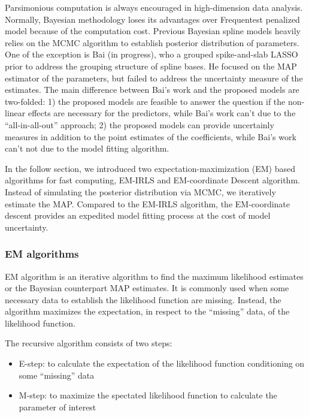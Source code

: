 \documentclass[AMA,STIX1COL,]{WileyNJD-v2}
\providecommand{\tightlist}{%
  \setlength{\itemsep}{0pt}\setlength{\parskip}{0pt}}
\begin{document}
Parsimonious computation is always encouraged in high-dimension data
analysis. Normally, Bayesian methodology loses its advantages over
Frequentest penalized model because of the computation cost. Previous
Bayesian spline models heavily relies on the MCMC algorithm to establish
posterior distribution of parameters. One of the exception is Bai (in
progress), who a grouped spike-and-slab LASSO prior \citep{Rockova2018}
to address the grouping structure of spline bases. He focused on the MAP
estimator of the parameters, but failed to address the uncertainty
measure of the estimates. The main difference between Bai's work and the
proposed models are two-folded: 1) the proposed models are feasible to
answer the question if the non-linear effects are necessary for the
predictors, while Bai's work can't due to the ``all-in-all-out''
approach; 2) the proposed models can provide uncertainly measures in
addition to the point estimates of the coefficients, while Bai's work
can't not due to the model fitting algorithm.

In the follow section, we introduced two expectation-maximization (EM)
based algorithms for fast computing, EM-IRLS and EM-coordinate Descent
algorithm. Instead of simulating the posterior distribution via MCMC, we
iteratively estimate the MAP. Compared to the EM-IRLS algorithm, the
EM-coordinate descent provides an expedited model fitting process at the
cost of model uncertainty.

\hfill\break

\hypertarget{em-algorithms}{%
\subsubsection{EM algorithms}\label{em-algorithms}}

EM algorithm is an iterative algorithm to find the maximum likelihood
estimates or the Bayesian counterpart MAP estimates. It is commonly used
when some necessary data to establish the likelihood function are
missing. Instead, the algorithm maximizes the expectation, in respect to
the ``missing'' data, of the likelihood function.

The recursive algorithm consists of two steps:

\begin{itemize}
\tightlist
\item
  E-step: to calculate the expectation of the likelihood function
  conditioning on some ``missing'' data
\item
  M-step: to maximize the spectated likelihood function to calculate the
  parameter of interest
\end{itemize}
\end{document}
